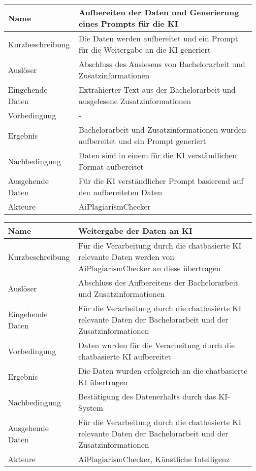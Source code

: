 \begin{tabularx}{\textwidth}{|l|X|}
    \hline
    \textbf{Name} & \textbf{Aufbereiten der Daten und Generierung eines Prompts für die KI} \\
    \hline
    Kurzbeschreibung & Die Daten werden aufbereitet und ein Prompt für die Weitergabe an die KI generiert \\
    \hline
    Auslöser & Abschluss des Auslesens von Bachelorarbeit und Zusatzinformationen \\
    \hline
    Eingehende Daten & Extrahierter Text aus der Bachelorarbeit und ausgelesene Zusatzinformationen \\
    \hline
    Vorbedingung & - \\
    \hline
    Ergebnis & Bachelorarbeit und Zusatzinformationen wurden aufbereitet und ein Prompt generiert \\
    \hline
    Nachbedingung & Daten sind in einem für die KI verständlichen Format aufbereitet \\
    \hline
    Ausgehende Daten & Für die KI verständlicher Prompt basierend auf den aufbereiteten Daten \\
    \hline
    Akteure & AiPlagiarismChecker \\
    \hline
\end{tabularx}


\begin{tabularx}{\textwidth}{|l|X|}
    \hline
    \textbf{Name} & \textbf{Weitergabe der Daten an KI} \\
    \hline
    Kurzbeschreibung & Für die Verarbeitung durch die chatbasierte KI relevante Daten werden von AiPlagiarismChecker an diese übertragen \\
    \hline
    Auslöser & Abschluss des Aufbereitens der Bachelorarbeit und Zusatzinformationen \\
    \hline
    Eingehende Daten & Für die Verarbeitung durch die chatbasierte KI relevante Daten der Bachelorarbeit und der Zusatzinformationen \\
    \hline
    Vorbedingung & Daten wurden für die Verarbeitung durch die chatbasierte KI aufbereitet \\
    \hline
    Ergebnis & Die Daten wurden erfolgreich an die chatbasierte KI übertragen \\
    \hline
    Nachbedingung & Bestätigung des Datenerhalts durch das KI-System \\
    \hline
    Ausgehende Daten & Für die Verarbeitung durch die chatbasierte KI relevante Daten der Bachelorarbeit und der Zusatzinformationen \\
    \hline
    Akteure & AiPlagiarismChecker, Künstliche Intelligenz \\
    \hline
\end{tabularx}


